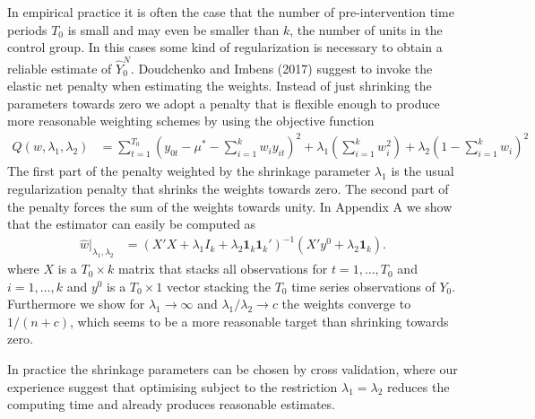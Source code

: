 \documentclass[12pt,a4paper]{article}
\begin{document}
In empirical practice it is often the case that the number of pre-intervention time periods $T_0$ is small and may even be smaller than $k$, the number of units in the control group. In this cases some kind of regularization is necessary to obtain a reliable estimate of $\widehat Y_0^N$. Doudchenko and Imbens (2017) suggest to invoke the elastic net penalty when estimating the weights. Instead of just shrinking the parameters towards zero we adopt a penalty that is flexible enough to produce more reasonable weighting schemes by using the objective function
\begin{align*}
Q(w,\lambda_1,\lambda_2) &= \sum_{t=1}^{T_0} \left( y_{0t}- \mu^* - \sum_{i=1}^k w_i y_{it}\right)^2  + \lambda_1 \left( \sum_{i=1}^k w_i^2 \right) + \lambda_2 \left(1- \sum_{i=1}^k  w_i\right)^2
\end{align*}
The first part of the penalty weighted by the shrinkage parameter $\lambda_1$ is the usual regularization penalty that shrinks the weights towards zero. The second part of the penalty forces the sum of the weights towards unity. In Appendix A we show that the estimator can easily be computed as
\begin{align*}
\widehat w|_{\lambda_1,\lambda_2} &= \left( X'X+\lambda_1 I_k + \lambda_2 \bm{1}_k\bm{1}_k' \right)^{-1} \left( X'y^0 + \lambda_2 \bm{1}_k \right) .
\end{align*}
where $X$ is a $T_0\times k$ matrix that stacks all observations for $t=1,\ldots,T_0$ and $i=1,\ldots,k$ and $y^0$ is a $T_0\times 1$ vector stacking the $T_0$ time series observations of $Y_0$.  Furthermore we show for $\lambda_1\to \infty$ and $\lambda_1/\lambda_2 \to c$ the weights converge to $1/(n+c)$, which seems to be a more reasonable target than shrinking towards zero.

In practice the shrinkage parameters can be chosen by cross validation, where our experience suggest that optimising subject to the restriction $\lambda_1=\lambda_2$ reduces the computing time and already produces reasonable estimates.
\end{document}
